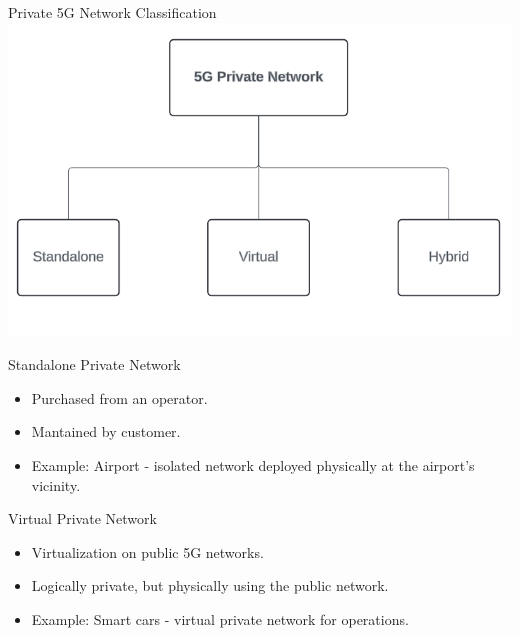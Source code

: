 \documentclass{beamer}
\begin{document}
\begin{frame}{Private 5G Network Classification}
  \hspace*{0.6em}
  \includegraphics[scale=0.6]{fig/5gprivate.png}
\end{frame}


\begin{frame}{Standalone Private Network}
  \vspace*{1.6em}
  \begin{itemize}
    \item Purchased from an operator.
    \vspace*{0.75em}
    \item Mantained by customer.
    \vspace*{0.75em}
    \item Example: Airport - isolated network deployed physically at the airport's vicinity.
  \end{itemize}
\end{frame}

\begin{frame}{Virtual Private Network}
  \vspace*{1.6em}
  \begin{itemize}
    \item Virtualization on public 5G networks.
    \vspace*{0.75em}
    \item Logically private, but physically using the public network.
    \vspace*{0.75em}
    \item Example: Smart cars - virtual private network for operations.
  \end{itemize}
\end{frame}
\end{document}
